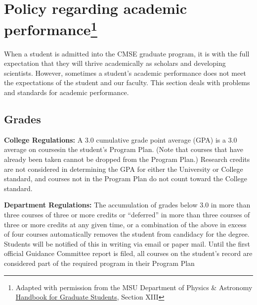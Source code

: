 \section[Policy regarding academic performance]{Policy regarding
  academic performance\footnote{Adapted with permission from the MSU
    Department of Physics \& Astronomy
    \href{https://www.pa.msu.edu/grad/GradHandbook_Aug2015.pdf}{Handbook
      for Graduate
      Students}, Section XIII}}

When a student is admitted into the CMSE graduate program, it is with
the full expectation that they will thrive academically as scholars
and developing scientists. However, sometimes a student's academic
performance does not meet the expectations of the student and our
faculty.  This section deals with problems and standards for academic
performance.

\subsection{Grades}

\noindent \textbf{College Regulations:} A 3.0 cumulative grade point
average (GPA) is a 3.0 average on coursesin the student's Program
Plan.  (Note that courses that have already been taken cannot be
dropped from the Program Plan.)  Research credits are not considered
in determining the GPA for either the University or College standard,
and courses not in the Program Plan do not count toward the College
standard.

\noindent \textbf{Department Regulations:} The accumulation of grades
below 3.0 in more than three courses of three or more credits or
``deferred'' in more than three courses of three or more credits at
any given time, or a combination of the above in excess of four
courses automatically removes the student from candidacy for the
degree.  Students will be notified of this in writing via email or
paper mail. Until the first official Guidance Committee report is
filed, all courses on the student's record are considered part of the
required program in their Program Plan



